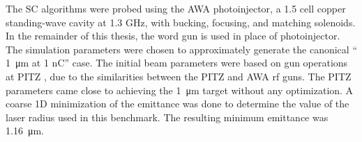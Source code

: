 The SC algorithms were probed using the AWA photoinjector, 
a 1.5 cell copper standing-wave cavity at 1.3 GHz, 
with bucking, focusing, and matching solenoids. 
In the remainder of this thesis, the word gun is used 
in place of photoinjector. The simulation parameters were chosen to 
approximately generate the canonical “ \SI{1}{\micro\metre} at  1 nC” case.  
The initial beam parameters were based on gun operations at PITZ \cite{pitz},
due to the similarities between the PITZ and AWA rf guns.
The PITZ parameters came close to achieving the \SI{1}{\micro\metre}
target without any optimization. A coarse 1D minimization
 of the 
emittance was done to determine the value of the laser radius 
used in this benchmark. The resulting minimum emittance was   
\SI{1.16}{\micro\metre}. 


